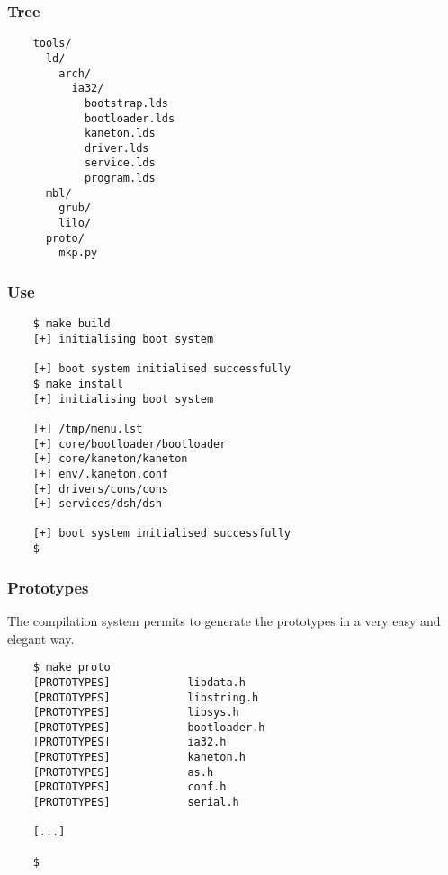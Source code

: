 
\begin{frame}[containsverbatim]
  \frametitle{Tree}

  \begin{verbatim}
    tools/
      ld/
        arch/
          ia32/
            bootstrap.lds
            bootloader.lds
            kaneton.lds
            driver.lds
            service.lds
            program.lds
      mbl/
        grub/
        lilo/
      proto/
        mkp.py
  \end{verbatim}
\end{frame}


\begin{frame}[containsverbatim]
  \frametitle{Use}

  \begin{verbatim}
    $ make build
    [+] initialising boot system

    [+] boot system initialised successfully
    $ make install
    [+] initialising boot system

    [+] /tmp/menu.lst
    [+] core/bootloader/bootloader
    [+] core/kaneton/kaneton
    [+] env/.kaneton.conf
    [+] drivers/cons/cons
    [+] services/dsh/dsh

    [+] boot system initialised successfully
    $
  \end{verbatim}
\end{frame}


\begin{frame}[containsverbatim]
  \frametitle{Prototypes}

  The compilation system permits to generate the prototypes in a very easy
  and elegant way.

  \begin{verbatim}
    $ make proto
    [PROTOTYPES]            libdata.h
    [PROTOTYPES]            libstring.h
    [PROTOTYPES]            libsys.h
    [PROTOTYPES]            bootloader.h
    [PROTOTYPES]            ia32.h
    [PROTOTYPES]            kaneton.h
    [PROTOTYPES]            as.h
    [PROTOTYPES]            conf.h
    [PROTOTYPES]            serial.h

    [...]

    $
  \end{verbatim}
\end{frame}


